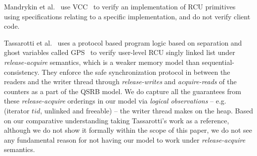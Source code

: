  Mandrykin et al.~\cite{Mandrykin:2016:TDV:3001219.3001297} use \textsf{VCC}~\cite{Cohen:2009:VPS:1616077.1616080} to verify an implementation of RCU primitives using specifications relating to a specific implementation, and do not verify client code.

 Tassarotti et al.~\cite{verrcu} uses a protocol based program logic based on separation and ghost variables called \textsf{GPS}~\cite{Turon:2014:GNW:2660193.2660243} to verify user-level \textsf{RCU} singly linked list under \emph{release-acquire} semantics, which is a weaker memory model than sequential-consistency. They enforce the safe synchronization protocol in between the readers and the writer thread through \textit{release-writes} and \textit{acquire-reads} of the counters as a part of the QSRB model. We do capture all the guarantees from these \textit{release-acquire} orderings in our model via \textit{logical observations} -- e.g. (\textsf{iterator} $tid$, \textsf{unlinked} and \textsf{freeable}) -- the writer thread makes on the heap. Based on our comparative understanding taking Tassarotti's work as a reference, although we do not show it formally within the scope of this paper, we do not see any fundamental reason for not having our model to work under \textit{release-acquire} semantics.

